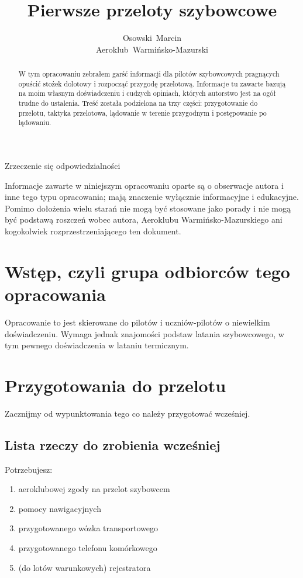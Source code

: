 \documentclass{article}
\title{Pierwsze przeloty szybowcowe}
\author{Osowski~Marcin\\Aeroklub~Warmińsko-Mazurski}
\begin{document}
\maketitle
\newpage

\begin{abstract}
W tym opracowaniu zebrałem garść informacji dla pilotów szybowcowych
pragnących opuścić stożek dolotowy i rozpocząć
przygodę przelotową. Informacje tu zawarte bazują na moim
własnym doświadczeniu i cudzych opiniach, których autorstwo jest na ogół
trudne do ustalenia. Treść została podzielona na trzy części:
przygotowanie do przelotu, taktyka przelotowa, 
lądowanie w terenie przygodnym i postępowanie po lądowaniu.
\end{abstract}
\newpage

\begin{center}\begin{huge}
Zrzeczenie się odpowiedzialności
\end{huge}\end{center}
Informacje zawarte w niniejszym opracowaniu oparte są o obserwacje
autora i inne tego typu opracowania; mają znaczenie wyłącznie informacyjne
i edukacyjne. Pomimo dołożenia wielu starań nie mogą być stosowane
jako porady i nie mogą być podstawą roszczeń wobec autora,
Aeroklubu Warmińsko-Mazurskiego ani kogokolwiek rozprzestrzeniającego
ten dokument.
\newpage


\tableofcontents
\newpage


\section{Wstęp, czyli grupa odbiorców tego opracowania}
Opracowanie to jest skierowane do pilotów i uczniów-pilotów o niewielkim
doświadczeniu. Wymaga jednak znajomości podstaw latania szybowcowego, w tym
pewnego doświadczenia w lataniu termicznym.
\newpage


\section{Przygotowania do przelotu}
Zacznijmy od wypunktowania tego co należy przygotować wcześniej.

\subsection{Lista rzeczy do zrobienia wcześniej}
Potrzebujesz:
\begin{enumerate}
\item aeroklubowej zgody na przelot szybowcem
\item pomocy nawigacyjnych
\item przygotowanego wózka transportowego
\item przygotowanego telefonu komórkowego
\item (do lotów warunkowych) rejestratora
\end{enumerate}
\end{document}
